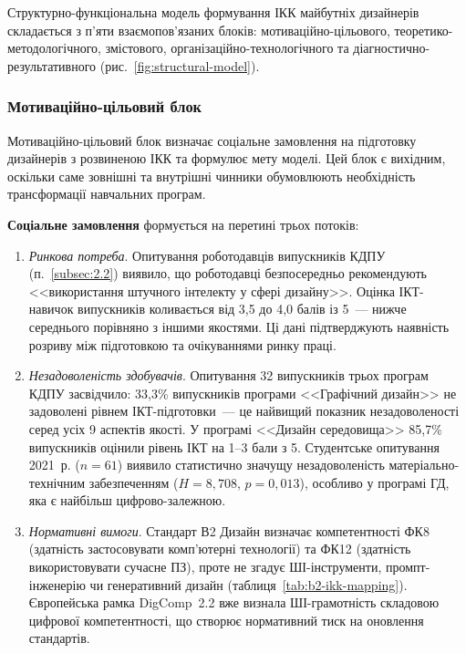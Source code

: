 Структурно-функціональна модель формування ІКК майбутніх дизайнерів складається з п'яти взаємопов'язаних блоків: мотиваційно-цільового, теоретико-методологічного, змістового, організаційно-технологічного та діагностично-результативного (рис.~\ref{fig:structural-model}).

\subsubsection{Мотиваційно-цільовий блок}\label{sssec:3.1.1}

Мотиваційно-цільовий блок визначає соціальне замовлення на підготовку дизайнерів з розвиненою ІКК та формулює мету моделі. Цей блок є вихідним, оскільки саме зовнішні та внутрішні чинники обумовлюють необхідність трансформації навчальних програм.

\textbf{Соціальне замовлення} формується на перетині трьох потоків:

\begin{enumerate}
    \item \textit{Ринкова потреба}. Опитування роботодавців випускників КДПУ (п.~\ref{subsec:2.2}) виявило, що роботодавці безпосередньо рекомендують <<використання штучного інтелекту у сфері дизайну>>. Оцінка ІКТ-навичок випускників коливається від 3,5 до 4,0 балів із 5~--- нижче середнього порівняно з іншими якостями. Ці дані підтверджують наявність розриву між підготовкою та очікуваннями ринку праці.

    \item \textit{Незадоволеність здобувачів}. Опитування 32 випускників трьох програм КДПУ засвідчило: 33,3\% випускників програми <<Графічний дизайн>> не задоволені рівнем ІКТ-підготовки~--- це найвищий показник незадоволеності серед усіх 9 аспектів якості. У програмі <<Дизайн середовища>> 85,7\% випускників оцінили рівень ІКТ на 1--3 бали з 5. Студентське опитування 2021~р. ($n = 61$) виявило статистично значущу незадоволеність матеріально-технічним забезпеченням ($H = 8{,}708$, $p = 0{,}013$), особливо у програмі ГД, яка є найбільш цифрово-залежною.

    \item \textit{Нормативні вимоги}. Стандарт В2 Дизайн визначає компетентності ФК8 (здатність застосовувати комп'ютерні технології) та ФК12 (здатність використовувати сучасне ПЗ), проте не згадує ШІ-інструменти, промпт-інженерію чи генеративний дизайн (таблиця~\ref{tab:b2-ikk-mapping}). Європейська рамка DigComp~2.2 вже визнала ШІ-грамотність складовою цифрової компетентності, що створює нормативний тиск на оновлення стандартів.
\end{enumerate}

